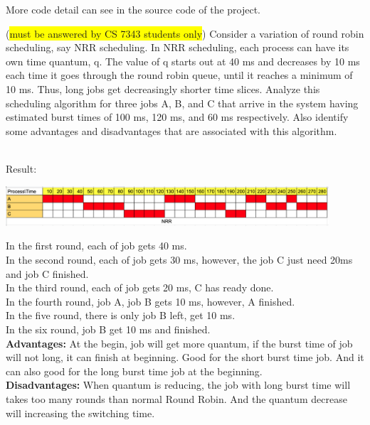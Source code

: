 \documentclass[12pt]{article}
\newenvironment{sol}[1][Solution]{\begin{trivlist}\item[\hskip\labelsep {\bfseries #1:}]}{\end{trivlist}}
\begin{document}
\begin{enumerate}
\begin{sol}
\begin{enumerate}
    \end{enumerate}
    More code detail can see in the source code of the project.
    \end{sol}
    \newpage
    \item (\colorbox{yellow}{must be answered by CS 7343 students only}) Consider a variation of round robin scheduling, say NRR scheduling. In NRR scheduling, each process can have its own time quantum, q. The value of q starts out at 40 ms and decreases by 10 ms each time it goes through the round robin queue, until it reaches a minimum of 10 ms. Thus, long jobs get decreasingly shorter time slices.
Analyze this scheduling algorithm for three jobs A, B, and C that arrive in the system having estimated burst times of 100 ms, 120 ms, and 60 ms respectively. Also identify some advantages and disadvantages that are associated with this algorithm.
\begin{sol}
    \hspace*{\fill} \\
    Result:
    \begin{center}
        \includegraphics[width=0.9\textwidth]{C.png}
    \end{center}
    In the first round, each of job gets 40 ms.\\
    In the second round, each of job gets 30 ms, however, the job C just need 20ms and job C finished.\\
    In the third round, each of job gets 20 ms, C has ready done. \\
    In the fourth round, job A, job B gets 10 ms, however, A finished.\\
    In the five round, there is only job B left, get 10 ms.\\
    In the six round, job B get 10 ms and finished.\\
    \textbf{Advantages:} At the begin, job will get more quantum, if the burst time of job will not long, it can finish at beginning. Good for the short burst time job. And it can also good for the long burst time job at the beginning.
    \\
    \textbf{Disadvantages:} When quantum is reducing, the job with long burst time will takes too many rounds than normal Round Robin. And the quantum decrease will increasing the switching time.
    
\end{sol}

\end{enumerate}
\end{document}
